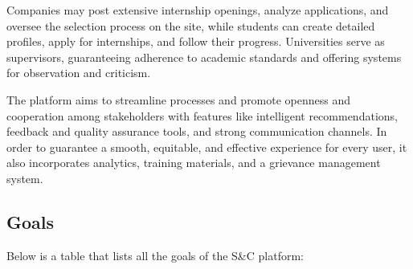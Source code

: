 Companies may post extensive internship openings, analyze applications, and oversee the selection process on the site, while students can create detailed profiles, apply for internships, and follow their progress. Universities serve as supervisors, guaranteeing adherence to academic standards and offering systems for observation and criticism.

The platform aims to streamline processes and promote openness and cooperation among stakeholders with features like intelligent recommendations, feedback and quality assurance tools, and strong communication channels. In order to guarantee a smooth, equitable, and effective experience for every user, it also incorporates analytics, training materials, and a grievance management system.

\subsection{Goals}
\label{subsec:goals}%
\setcounter{g}{1}
\newcommand{\cg}{\theg\stepcounter{g}}

Below is a table that lists all the goals of the S\&C platform:

